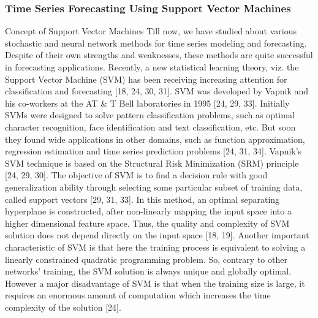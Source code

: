 \documentclass[10pt]{report}
\begin{document}
\begin{flushleft}
		\subsubsection{Time Series Forecasting Using Support Vector Machines}
		Concept of Support Vector Machines 
		Till now, we have studied about various stochastic and neural network methods for time 
		series modeling and forecasting. Despite of their own strengths and weaknesses, these methods are quite successful in forecasting applications.  Recently, a new statistical learning theory, viz. the Support Vector Machine (SVM) has been receiving increasing attention for classification and forecasting [18, 24, 30, 31]. SVM was developed by Vapnik and his co-workers at the AT \& T Bell laboratories in 1995 [24, 29, 33]. Initially SVMs were designed to solve pattern classification problems, such as optimal character recognition, face identification and text classification, etc. But soon they found wide applications in other domains, such as function approximation, regression estimation and time series prediction problems [24, 31, 34]. 
		Vapnik’s SVM technique is based on the Structural Risk Minimization (SRM) principle 
		[24, 29, 30]. The objective of SVM is to find a decision rule with good generalization ability through selecting some particular subset of training data, called support vectors [29, 31, 33]. In this method, an optimal separating hyperplane is constructed, after non-linearly mapping the input space into a higher dimensional feature space. Thus, the quality and complexity of SVM solution does not depend directly on the input space [18, 19].  
		Another important characteristic of SVM is that here the training process is equivalent to solving a linearly constrained quadratic programming problem. So, contrary to other networks’ training, the SVM solution is always unique and globally optimal. However a major disadvantage of SVM is that when the training size is large, it requires an enormous amount of computation which increases the time complexity of the solution [24].

\end{flushleft}
\end{document}
